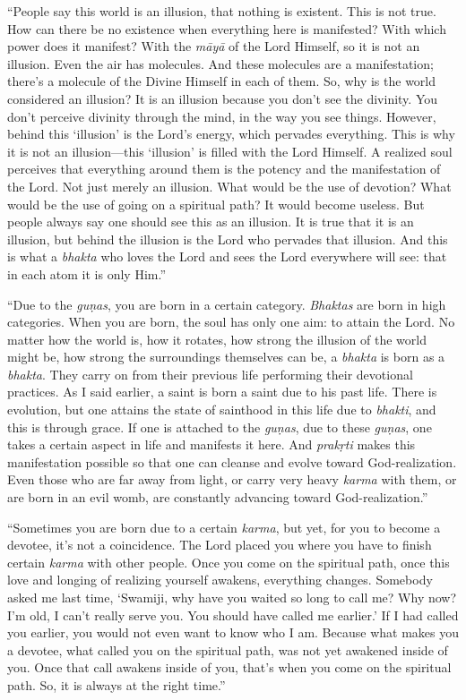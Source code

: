 \enquote{People say this world is an illusion, that nothing is existent. This is not true. How can there be no existence when everything here is manifested? With which power does it manifest? With the \textit{māyā} of the Lord Himself, so it is not an illusion. Even the air has molecules. And these molecules are a manifestation; there’s a molecule of the Divine Himself in each of them. So, why is the world considered an illusion? It is an illusion because you don’t see the divinity. You don’t perceive divinity through the mind, in the way you see things. However, behind this \enquote{illusion} is the Lord’s energy, which pervades everything. This is why it is not an illusion---this \enquote{illusion} is filled with the Lord Himself. A realized soul perceives that everything around them is the potency and the manifestation of the Lord. Not just merely an illusion. What would be the use of devotion? What would be the use of going on a spiritual path? It would become useless. But people always say one should see this as an illusion. It is true that it is an illusion, but behind the illusion is the Lord who pervades that illusion. And this is what a \textit{bhakta} who loves the Lord and sees the Lord everywhere will see: that in each atom it is only Him.}

\enquote{Due to the \textit{guṇas}, you are born in a certain category. \textit{Bhaktas} are born in high categories. When you are born, the soul has only one aim: to attain the Lord. No matter how the world is, how it rotates, how strong the illusion of the world might be, how strong the surroundings themselves can be, a \textit{bhakta} is born as a \textit{bhakta}. They carry on from their previous life performing their devotional practices. As I said earlier, a saint is born a saint due to his past life. There is evolution, but one attains the state of sainthood in this life due to \textit{bhakti}, and this is through grace. If one is attached to the \textit{guṇas}, due to these \textit{guṇas}, one takes a certain aspect in life and manifests it here. And \textit{prakṛti} makes this manifestation possible so that one can cleanse and evolve toward God-realization. Even those who are far away from light, or carry very heavy \textit{karma} with them, or are born in an evil womb, are constantly advancing toward God-realization.}

\enquote{Sometimes you are born due to a certain \textit{karma}, but yet, for you to become a devotee, it’s not a coincidence. The Lord placed you where you have to finish certain \textit{karma} with other people. Once you come on the spiritual path, once this love and longing of realizing yourself awakens, everything changes. Somebody asked me last time, \enquote{Swamiji, why have you waited so long to call me? Why now? I’m old, I can’t really serve you. You should have called me earlier.} If I had called you earlier, you would not even want to know who I am. Because what makes you a devotee, what called you on the spiritual path, was not yet awakened inside of you. Once that call awakens inside of you, that’s when you come on the spiritual path. So, it is always at the right time.}

